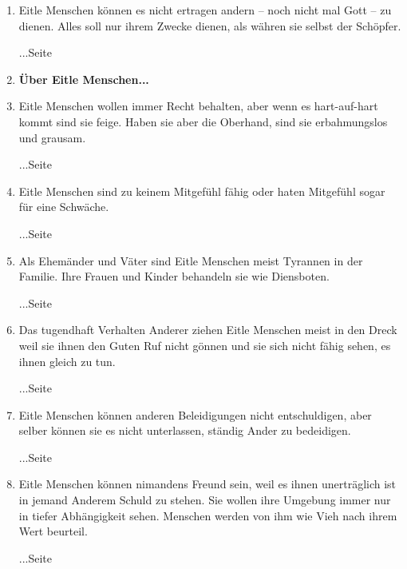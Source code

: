\begin{enumerate}
\begin{enumerate} 
 \item Eitle Menschen können es nicht ertragen andern -- noch nicht mal Gott -- zu dienen. Alles soll nur ihrem Zwecke dienen, als währen sie selbst der Schöpfer.
 \begin{flushright}...Seite \pageref{ref:12_01_egoisten}\end{flushright}
 \item \textbf{Über Eitle Menschen...}
 \item Eitle Menschen wollen immer Recht behalten, aber wenn es hart-auf-hart kommt sind sie feige. Haben sie aber die Oberhand, sind sie erbahmungslos und grausam.
 \begin{flushright}...Seite \pageref{ref:12_02_eitle_menschen_streit}\end{flushright}
 \item Eitle Menschen sind zu keinem Mitgefühl fähig oder haten Mitgefühl sogar für eine Schwäche.
 \begin{flushright}...Seite \pageref{ref:12_02_eitle_menschen_mitgefuehl}\end{flushright}
 \item Als Ehemänder und Väter sind Eitle Menschen meist Tyrannen in der Familie. Ihre Frauen und Kinder behandeln sie wie Diensboten.
 \begin{flushright}...Seite \pageref{ref:12_03_eitle_menschen_ehe}\end{flushright}
 \item Das tugendhaft Verhalten Anderer ziehen Eitle Menschen meist in den Dreck weil sie ihnen den Guten Ruf nicht gönnen und sie sich nicht fähig sehen, es ihnen gleich zu tun.
 \begin{flushright}...Seite \pageref{ref:12_04_eitle_menschen_tugent}\end{flushright}
 \item Eitle Menschen können anderen Beleidigungen nicht entschuldigen, aber selber können sie es nicht unterlassen, ständig Ander zu bedeidigen.
 \begin{flushright}...Seite \pageref{ref:12_04_eitle_menschen_beleidigung}\end{flushright}
 \item Eitle Menschen können nimandens Freund sein, weil es ihnen unerträglich ist in jemand Anderem Schuld zu stehen. Sie wollen ihre Umgebung immer nur in tiefer Abhängigkeit sehen. Menschen werden von ihm wie Vieh nach ihrem Wert beurteil.
 \begin{flushright}...Seite \pageref{ref:12_05_eitle_menschen_freundschaft}\end{flushright}

\end{enumerate}
\end{enumerate}

